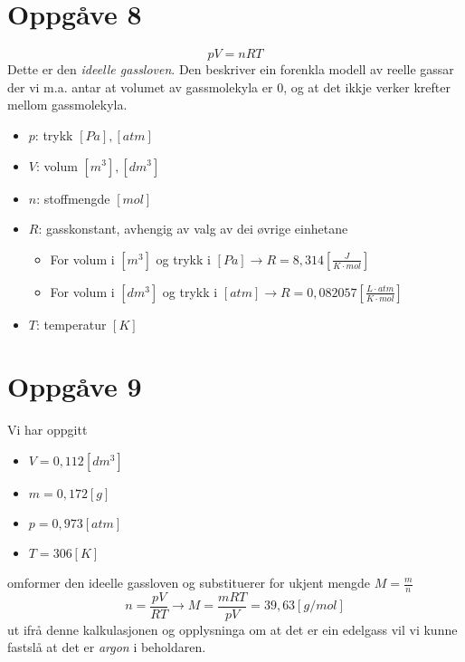 \documentclass[12pt,a4paper]{article}
\begin{document}
  \section*{Oppgåve 8}
    \begin{equation}
      pV=nRT
    \end{equation}
    Dette er den \textit{ideelle gassloven}. Den beskriver ein forenkla modell
    av reelle gassar der vi m.a. antar at volumet av gassmolekyla er 0, og at
    det ikkje verker krefter mellom gassmolekyla.
    \begin{itemize}
      \item $p$: trykk $[Pa], [atm]$
      \item $V$: volum $[m^3], [dm^3]$
      \item $n$: stoffmengde $[mol]$
      \item $R$: gasskonstant, avhengig av valg av dei øvrige einhetane
        \begin{itemize}
          \item For volum i $[m^3]$ og trykk i $[Pa]\rightarrow
            R =8,314[\frac{J}{K\cdot mol}]$ 
          \item For volum i $[dm^3]$ og trykk i $[atm]\rightarrow
            R =0,082057[\frac{L\cdot atm}{K\cdot mol}]$
        \end{itemize}
      \item $T$: temperatur $[K]$
    \end{itemize}


  \section*{Oppgåve 9}
    Vi har oppgitt
    \begin{itemize}
      \item $V = 0,112[dm^3]$
      \item $m = 0,172[g]$
      \item $p = 0,973[atm]$
      \item $T = 306 [K]$
    \end{itemize}
    omformer den ideelle gassloven og substituerer for ukjent mengde $M = \frac{m}{n}$
    \begin{equation}
      n = \frac{pV}{RT} \rightarrow M = \frac{mRT}{pV} = 39,63[g/mol]
    \end{equation}
    ut ifrå denne kalkulasjonen og opplysninga om at det er ein edelgass vil vi kunne
    fastslå at det er \textit{argon} i beholdaren.
\end{document}
